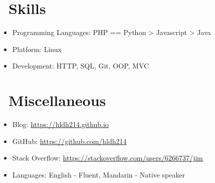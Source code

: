 \documentclass{resume}
\begin{document}
\section{\faCogs\ Skills}
\begin{itemize}[parsep=0.5ex]
  \item Programming Languages: PHP == Python > Javascript > Java
  \item Platform: Linux
  \item Development: HTTP, SQL, Git, OOP, MVC
\end{itemize}

\section{\faInfo\ Miscellaneous}
\begin{itemize}[parsep=0.5ex]
  \item Blog: \url{https://hldh214.github.io}
  \item GitHub: \url{https://github.com/hldh214}
  \item Stack Overflow: \url{https://stackoverflow.com/users/6266737/jim}
  \item Languages: English - Fluent, Mandarin - Native speaker
\end{itemize}
\end{document}
